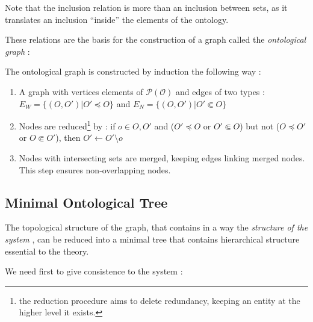 Note that the inclusion relation is more than an inclusion between sets, as it translates an inclusion ``inside'' the elements of the ontology.

These relations are the basis for the construction of a graph called the \emph{ontological graph} :

\begin{definition}
The {ontological graph} is constructed by induction the following way :
\begin{enumerate}
\item A graph with vertices elements of $\mathcal{P(O)}$ and edges of two types : $E_W = \{(O,O') | O' \preccurlyeq O \}$ and $E_N = \{(O,O') | O' \Subset O \}$
\item Nodes are reduced\footnote{the reduction procedure aims to delete redundancy, keeping an entity at the higher level it exists.} by : if $o \in O,O'$ and ($O' \preccurlyeq O$ or $O' \Subset O$) but not ($O \preccurlyeq O'$ or $O \Subset O'$), then $O' \leftarrow O' \setminus o$
\item Nodes with intersecting sets are merged, keeping edges linking merged nodes. This step ensures non-overlapping nodes.
\end{enumerate}
\end{definition}





\subsection*{Minimal Ontological Tree}


The topological structure of the graph, that contains in a way the \emph{structure of the system}%
, can be reduced into a minimal tree that contains hierarchical structure essential to the theory.

We need first to give consistence to the system :

